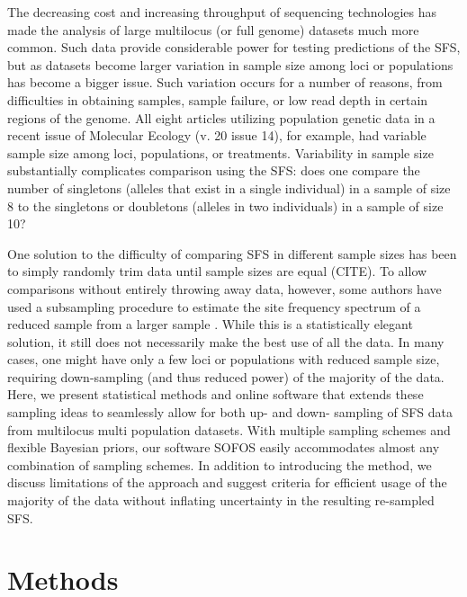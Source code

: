 \documentclass[11pt,letterpaper]{article}
\begin{document}
The decreasing cost and increasing throughput of sequencing technologies has made the analysis of large multilocus (or full genome) datasets much more common.  Such data provide considerable power for testing predictions of the SFS, but as datasets become larger variation in sample size among loci or populations has become a bigger issue.  Such variation occurs for a number of reasons, from difficulties in obtaining samples, sample failure, or low read depth in certain regions of the genome.  All eight articles utilizing population genetic data in a recent issue of Molecular Ecology (v. 20 issue 14), for example, had variable sample size among loci, populations, or treatments.  Variability in sample size substantially complicates comparison using the SFS:  does one compare the number of singletons (alleles that exist in a single individual) in a sample of size 8 to the singletons or doubletons (alleles in two individuals) in a sample of size 10?  

One solution to the difficulty of comparing SFS in different sample sizes has been to simply randomly trim data until sample sizes are equal (CITE).  To allow comparisons without entirely throwing away data, however, some authors have used a subsampling procedure to estimate the site frequency spectrum of a reduced sample from a larger sample \citep{Nielsen2005}.  While this is a statistically elegant solution, it still does not necessarily make the best use of all the data.  In many cases, one might have only a few loci or populations with reduced sample size, requiring down-sampling (and thus reduced power) of the majority of the data.  Here, we present statistical methods and online software that extends these sampling ideas to seamlessly allow for both up- and down- sampling of SFS data from multilocus multi population datasets.  With multiple sampling schemes and flexible Bayesian priors, our software SOFOS easily accommodates almost any combination of sampling schemes.  In addition to introducing the method, we discuss limitations of the approach and suggest criteria for efficient usage of the majority of the data without inflating uncertainty in the resulting re-sampled SFS.


\section{Methods}
\end{document}
